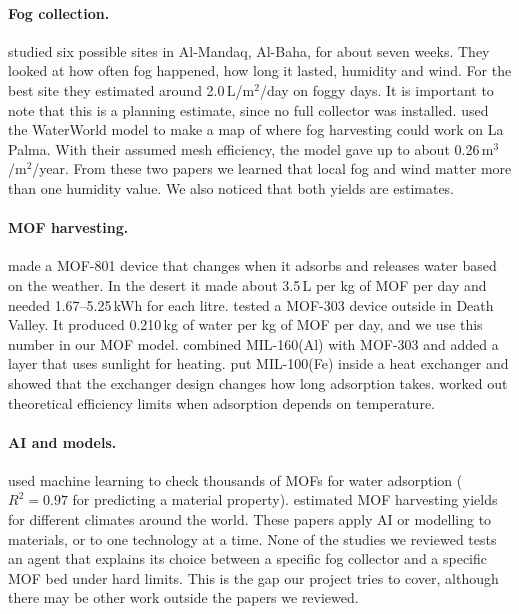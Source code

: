 \documentclass[11pt]{article}
\begin{document}
\paragraph{Fog collection.} \citet{alzahrani2025fog} studied six possible sites in Al-Mandaq, Al-Baha, for about seven weeks. They looked at how often fog happened, how long it lasted, humidity and wind. For the best site they estimated around 2.0\,L/m$^2$/day on foggy days. It is important to note that this is a planning estimate, since no full collector was installed. \citet{perez2025catching} used the WaterWorld model to make a map of where fog harvesting could work on La Palma. With their assumed mesh efficiency, the model gave up to about 0.26\,m$^3$/m$^2$/year. From these two papers we learned that local fog and wind matter more than one humidity value. We also noticed that both yields are estimates.

\paragraph{MOF harvesting.} \citet{almassad2022adaptive} made a MOF-801 device that changes when it adsorbs and releases water based on the weather. In the desert it made about 3.5\,L per kg of MOF per day and needed 1.67--5.25\,kWh for each litre. \citet{song2023mof} tested a MOF-303 device outside in Death Valley. It produced 0.210\,kg of water per kg of MOF per day, and we use this number in our MOF model. \citet{luo2023solar} combined MIL-160(Al) with MOF-303 and added a layer that uses sunlight for heating. \citet{fotia2026mil100} put MIL-100(Fe) inside a heat exchanger and showed that the exchanger design changes how long adsorption takes. \citet{li2022thermo} worked out theoretical efficiency limits when adsorption depends on temperature.

\paragraph{AI and models.} \citet{li2022ml} used machine learning to check thousands of MOFs for water adsorption ($R^2=0.97$ for predicting a material property). \citet{wang2023global} estimated MOF harvesting yields for different climates around the world. These papers apply AI or modelling to materials, or to one technology at a time. None of the studies we reviewed tests an agent that explains its choice between a specific fog collector and a specific MOF bed under hard limits. This is the gap our project tries to cover, although there may be other work outside the papers we reviewed.
\end{document}
